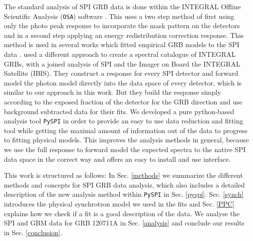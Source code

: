 \documentclass[twocolumn,traditabstract]{aa}
\begin{document}
The standard analysis of SPI GRB data is done within the INTEGRAL Offline Scientific Analysis ({\tt OSA}) software \citep{osa}. This uses a two step method of first using only the photo peak response to incorporate the mask pattern on the detectors and in a second step applying an energy redistribution correction response. This method is used in several works which fitted empirical GRB models to the SPI data \citep{Malaguti-2003, Mereghetti-2003, Mereghetti-2003.2, Kienlin-2003, Kienlin-2003.2,Beckmann-2004, Moran-2005, Filliatre-2005.1, Filliatre-2005.2, McBreen-2006, Grebenev-2007, McGlynn-2008, Foley-2008, McGlynn-2009, Martin-Carrillo-2014}. \citet{Bosnjak-2014} used a different approach to create a spectral catalogue of INTEGRAL GRBs, with a joined analysis of SPI and the Imager on Board the INTEGRAL Satellite (IBIS). They construct a response for every SPI detector and forward model the photon model directly into the data space of every detector, which is similar to our approach in this work. But they build the response simply according to the exposed fraction of the detector for the GRB direction and use background subtracted data for their fits.
We developed a pure python-based analysis tool {\tt PySPI} in order to provide an easy to use data reduction and fitting tool while getting the maximal amount of information out of the data to progress to fitting physical models. This improves the analysis methods in general, because we use the full response to forward model the expected spectra to the native SPI data space in the correct way and offers an easy to install and use interface.

This work is structured as follows: In Sec. \ref{methods} we summarize the different methods and concepts for SPI GRB data analysis, which also includes a detailed description of the new analysis method within {\tt PySPI} in Sec. \ref{pyspi}. Sec. \ref{synch} introduces the physical synchrotron model we used in the fits and Sec. \ref{PPC} explains how we check if a fit is a good description of the data. We analyse the SPI and GBM data for GRB 120711A in Sec. \ref{analysis} and conclude our results in Sec. \ref{conclusion}.
\end{document}
